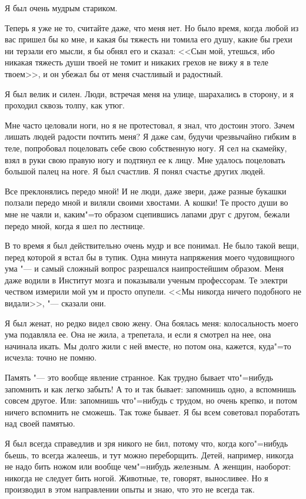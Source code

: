 
Я был очень мудрым стариком.

Теперь я уже не то, считайте даже, что меня нет. Но было время, когда любой из вас
пришел бы ко мне, и какая бы тяжесть ни томила его душу, какие бы грехи ни терзали его
мысли, я бы обнял его и сказал: <<Сын мой, утешься, ибо никакая тяжесть души твоей не
томит и никаких грехов не вижу я в теле твоем>>, и он убежал бы от меня счастливый и
радостный.

Я был велик и силен. Люди, встречая меня на улице, шарахались в сторону, и я проходил
сквозь толпу, как утюг.

Мне часто целовали ноги, но я не протестовал, я знал, что достоин этого. Зачем лишать людей радости почтить меня? Я даже сам,
будучи чрезвычайно гибким в теле, попробовал поцеловать себе свою собственную ногу. Я сел
на скамейку, взял в руки свою правую ногу и подтянул ее к лицу. Мне удалось поцеловать
большой палец на ноге. Я был счастлив. Я понял счастье других людей.

Все преклонялись передо мной! И не люди, даже звери, даже разные букашки ползали передо мной и виляли своими хвостами. 
А кошки! Те просто души во мне не чаяли и, каким"=то образом сцепившись лапами друг с другом,
бежали передо мной, когда я шел по лестнице.

В то время я был действительно очень мудр и все понимал. Не было такой вещи, перед которой я встал бы в тупик. Одна минута
напряжения моего чудовищного ума "--- и самый сложный вопрос разрешался наипростейшим образом. Меня даже водили в Институт мозга и
показывали ученым профессорам. Те электри чеством измерили мой ум и просто опупели. <<Мы
никогда ничего подобного не видали>>, "--- сказали они.

Я был женат, но редко видел свою жену. Она боялась меня: колосальность моего ума
подавляла ее. Она не жила, а трепетала, и если я смотрел на нее, она начинала икать.
Мы долго жили с ней вместе, но потом она, кажется, куда"=то исчезла: точно не помню.

Память "--- это вообще явление странное. Как трудно бывает что"=нибудь запомнить и
как легко забыть! А то и так бывает: запомнишь одно, а вспомнишь совсем другое. Или:
запомнишь что"=нибудь с трудом, но очень крепко, и потом ничего вспомнить не сможешь.
Так тоже бывает. Я бы всем советовал поработать над своей памятью.

Я был всегда справедлив и зря никого не бил, потому что, когда кого"=нибудь бьешь,
то всегда жалеешь, и тут можно переборщить. Детей, например, никогда не надо бить ножом
или вообще чем"=нибудь железным. А женщин, наоборот: никогда не следует бить ногой.
Животные, те, говорят, выносливее. Но я производил в этом направлении опыты и знаю,
что это не всегда так.


